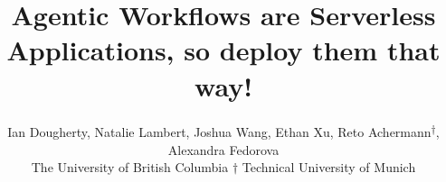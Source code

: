 \newcommand{\iantodo}[1]{\todo[color=green!40]{#1}}
\newcommand{\task}[1]{\todo[inline,color=orange!40]{#1}}
\newcommand{\taskred}[1]{\todo[inline,color=red!40]{#1}}
\raggedbottom


\usepackage{enumitem}



\date{}

\title{\Large \bf Agentic Workflows are Serverless Applications, so deploy them that way!}

\author{
{\rm Ian Dougherty, Natalie Lambert, Joshua Wang, Ethan Xu, Reto Achermann\textsuperscript{$\dagger$}, Alexandra Fedorova}\\
The University of British Columbia \quad$\dagger$ Technical University of Munich
}

\maketitle

